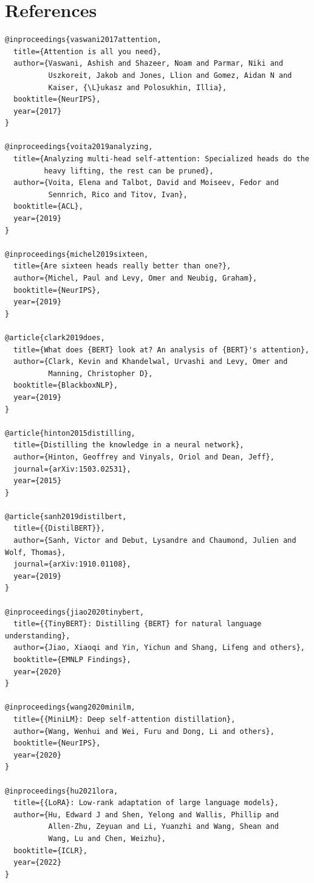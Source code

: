 
\section{References}

\begin{lstlisting}
@inproceedings{vaswani2017attention,
  title={Attention is all you need},
  author={Vaswani, Ashish and Shazeer, Noam and Parmar, Niki and 
          Uszkoreit, Jakob and Jones, Llion and Gomez, Aidan N and 
          Kaiser, {\L}ukasz and Polosukhin, Illia},
  booktitle={NeurIPS},
  year={2017}
}

@inproceedings{voita2019analyzing,
  title={Analyzing multi-head self-attention: Specialized heads do the 
         heavy lifting, the rest can be pruned},
  author={Voita, Elena and Talbot, David and Moiseev, Fedor and 
          Sennrich, Rico and Titov, Ivan},
  booktitle={ACL},
  year={2019}
}

@inproceedings{michel2019sixteen,
  title={Are sixteen heads really better than one?},
  author={Michel, Paul and Levy, Omer and Neubig, Graham},
  booktitle={NeurIPS},
  year={2019}
}

@article{clark2019does,
  title={What does {BERT} look at? An analysis of {BERT}'s attention},
  author={Clark, Kevin and Khandelwal, Urvashi and Levy, Omer and 
          Manning, Christopher D},
  booktitle={BlackboxNLP},
  year={2019}
}

@article{hinton2015distilling,
  title={Distilling the knowledge in a neural network},
  author={Hinton, Geoffrey and Vinyals, Oriol and Dean, Jeff},
  journal={arXiv:1503.02531},
  year={2015}
}

@article{sanh2019distilbert,
  title={{DistilBERT}},
  author={Sanh, Victor and Debut, Lysandre and Chaumond, Julien and Wolf, Thomas},
  journal={arXiv:1910.01108},
  year={2019}
}

@inproceedings{jiao2020tinybert,
  title={{TinyBERT}: Distilling {BERT} for natural language understanding},
  author={Jiao, Xiaoqi and Yin, Yichun and Shang, Lifeng and others},
  booktitle={EMNLP Findings},
  year={2020}
}

@inproceedings{wang2020minilm,
  title={{MiniLM}: Deep self-attention distillation},
  author={Wang, Wenhui and Wei, Furu and Dong, Li and others},
  booktitle={NeurIPS},
  year={2020}
}

@inproceedings{hu2021lora,
  title={{LoRA}: Low-rank adaptation of large language models},
  author={Hu, Edward J and Shen, Yelong and Wallis, Phillip and 
          Allen-Zhu, Zeyuan and Li, Yuanzhi and Wang, Shean and 
          Wang, Lu and Chen, Weizhu},
  booktitle={ICLR},
  year={2022}
}


\end{lstlisting}
